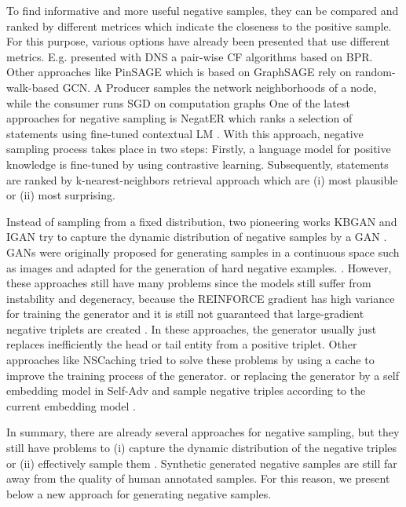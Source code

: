 To find informative and more useful negative samples, they can be compared and ranked by different metrices which indicate the closeness to the positive sample.
For this purpose, various options have already been presented that use different metrics.
E.g. \cite{DNS} presented with \ac{DNS} a pair-wise \ac{CF} algorithms based on \ac{BPR}.
Other approaches like \ac{PinSAGE} \cite{PinSAGE} which is based on \ac{GraphSAGE} \cite{GraphSAGE} rely on random-walk-based \ac{GCN}. 
A Producer samples the network neighborhoods of a node, while the consumer 
runs \ac{SGD} on computation graphs    
One of the latest approaches for negative sampling is \ac{NegatER}
which ranks a selection of statements using fine-tuned contextual \ac{LM} \cite{safavi2021negater}.
With this approach, negative sampling process takes place in two steps:
Firstly, a language model for positive knowledge is fine-tuned by using contrastive learning.
Subsequently, statements are ranked by k-nearest-neighbors retrieval approach which are (i) most plausible or (ii) most surprising.

Instead of sampling from a fixed distribution, two pioneering works \ac{KBGAN} \cite{cai2017kbgan} and \ac{IGAN} \cite{IGAN} try to capture the dynamic distribution of negative samples by a \ac{GAN} \cite{zhang2021efficient}.
\acp{GAN} were originally proposed for generating samples in a continuous space such as images and adapted for the generation of hard negative examples.
 \cite{zhang2021efficient}.
However, these approaches still have many problems since the models still suffer from instability and degeneracy, because the REINFORCE gradient has high variance for training the generator and it is still not guaranteed that large-gradient negative triplets are created \cite{zhang2021efficient}.
In these approaches, the generator usually just replaces inefficiently the head or tail entity from a positive triplet.
Other approaches like NSCaching tried to solve these problems by using a cache \cite{zhang2021efficient} to improve the training process of the generator.
or replacing the generator by a self embedding model in \ac{Self-Adv} and sample negative triples according to the current embedding model \cite{Self-Adv}.

    
In summary, there are already several approaches for negative sampling, but they still have problems to (i) capture the dynamic distribution of the negative triples or (ii) effectively sample them \cite{zhang2021efficient}.
Synthetic generated negative samples are still far away from the quality of human annotated samples.
For this reason, we present below a new approach for generating negative samples.



